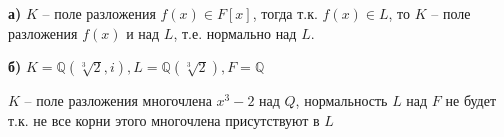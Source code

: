\textbf{а)} $K$ -- поле разложения $f(x) \in F[x]$, тогда т.к. $f(x) \in L$, то $K$ -- поле разложения $f(x)$ и над $L$, т.е. нормально над $L$.

\textbf{б)} $K = \mathbb{Q}(\sqrt[3]{2}, i), L = \mathbb{Q}(\sqrt[3]{2}), F = \mathbb{Q}$

$K$ -- поле разложения многочлена $x^3 - 2$ над $Q$, нормальность $L$ над $F$ не будет т.к. не все корни этого многочлена присутствуют в $L$

